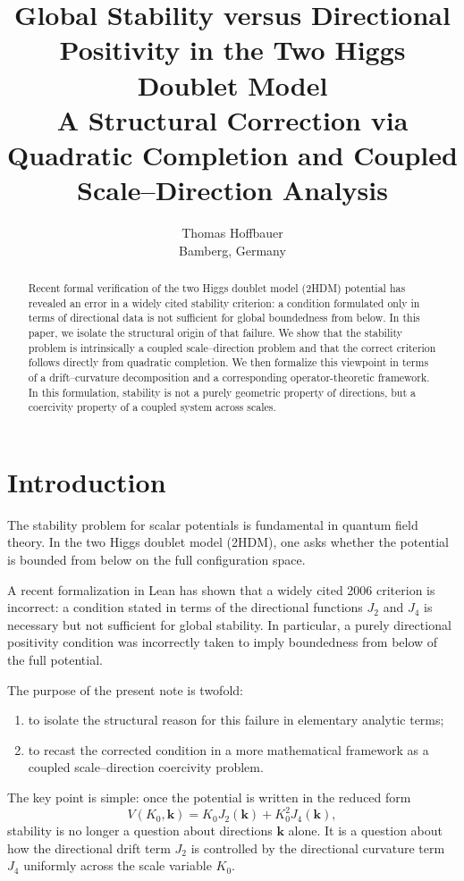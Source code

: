 \documentclass[11pt,a4paper]{article}
\title{
	Global Stability versus Directional Positivity in the Two Higgs Doublet Model\\
	\large A Structural Correction via Quadratic Completion and Coupled Scale--Direction Analysis
}
\author{
	Thomas Hoffbauer\\
	\small Bamberg, Germany
}
\date{}
\newcommand{\kk}{\bm{k}}
\begin{document}
	
	\maketitle
	
	\begin{abstract}
		Recent formal verification of the two Higgs doublet model (2HDM) potential has revealed an error in a widely cited stability criterion: a condition formulated only in terms of directional data is not sufficient for global boundedness from below. In this paper, we isolate the structural origin of that failure. We show that the stability problem is intrinsically a coupled scale--direction problem and that the correct criterion follows directly from quadratic completion. We then formalize this viewpoint in terms of a drift--curvature decomposition and a corresponding operator-theoretic framework. In this formulation, stability is not a purely geometric property of directions, but a coercivity property of a coupled system across scales.
	\end{abstract}
	
	\section{Introduction}
	
	The stability problem for scalar potentials is fundamental in quantum field theory. In the two Higgs doublet model (2HDM), one asks whether the potential is bounded from below on the full configuration space.
	
	A recent formalization in Lean has shown that a widely cited 2006 criterion is incorrect: a condition stated in terms of the directional functions \(J_2\) and \(J_4\) is necessary but not sufficient for global stability. In particular, a purely directional positivity condition was incorrectly taken to imply boundedness from below of the full potential.
	
	The purpose of the present note is twofold:
	\begin{enumerate}
		\item to isolate the structural reason for this failure in elementary analytic terms;
		\item to recast the corrected condition in a more mathematical framework as a coupled scale--direction coercivity problem.
	\end{enumerate}
	
	The key point is simple: once the potential is written in the reduced form
	\[
	V(K_0,\kk)=K_0J_2(\kk)+K_0^2J_4(\kk),
	\]
	stability is no longer a question about directions \(\kk\) alone. It is a question about how the directional drift term \(J_2\) is controlled by the directional curvature term \(J_4\) uniformly across the scale variable \(K_0\).
	
\end{document}
